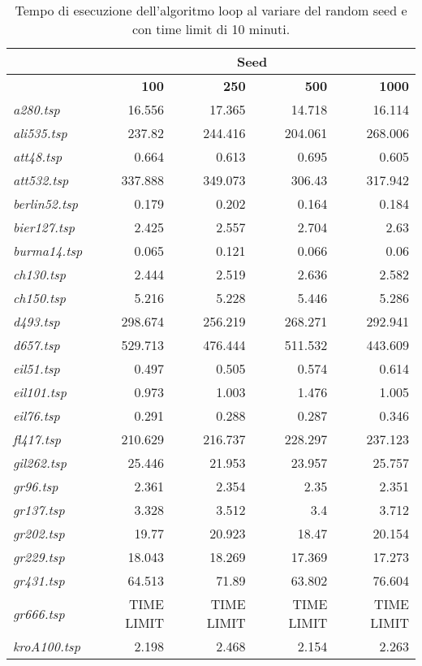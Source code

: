 {\footnotesize
\begin{longtable}[H]{lrrrr}
\caption{Tempo di esecuzione dell'algoritmo loop al variare del random seed e con time limit di 10 minuti.}\\
\cline{2-5}
{} & \multicolumn{4}{c}{\textbf{Seed}}\\
\hline
{} & \textbf{100} & \textbf{250} & \textbf{500} & \textbf{1000}\\
\hline
\textit{a280.tsp} & 16.556 & 17.365 & 14.718 & 16.114\\
\textit{ali535.tsp} & 237.82 & 244.416 & 204.061 & 268.006\\
\textit{att48.tsp} & 0.664 & 0.613 & 0.695 & 0.605\\
\textit{att532.tsp} & 337.888 & 349.073 & 306.43 & 317.942\\
\textit{berlin52.tsp} & 0.179 & 0.202 & 0.164 & 0.184\\
\textit{bier127.tsp} & 2.425 & 2.557 & 2.704 & 2.63\\
\textit{burma14.tsp} & 0.065 & 0.121 & 0.066 & 0.06\\
\textit{ch130.tsp} & 2.444 & 2.519 & 2.636 & 2.582\\
\textit{ch150.tsp} & 5.216 & 5.228 & 5.446 & 5.286\\
\textit{d493.tsp} & 298.674 & 256.219 & 268.271 & 292.941\\
\textit{d657.tsp} & 529.713 & 476.444 & 511.532 & 443.609\\
\textit{eil51.tsp} & 0.497 & 0.505 & 0.574 & 0.614\\
\textit{eil101.tsp} & 0.973 & 1.003 & 1.476 & 1.005\\
\textit{eil76.tsp} & 0.291 & 0.288 & 0.287 & 0.346\\
\textit{fl417.tsp} & 210.629 & 216.737 & 228.297 & 237.123\\
\textit{gil262.tsp} & 25.446 & 21.953 & 23.957 & 25.757\\
\textit{gr96.tsp} & 2.361 & 2.354 & 2.35 & 2.351\\
\textit{gr137.tsp} & 3.328 & 3.512 & 3.4 & 3.712\\
\textit{gr202.tsp} & 19.77 & 20.923 & 18.47 & 20.154\\
\textit{gr229.tsp} & 18.043 & 18.269 & 17.369 & 17.273\\
\textit{gr431.tsp} & 64.513 & 71.89 & 63.802 & 76.604\\
\textit{gr666.tsp} & TIME LIMIT & TIME LIMIT & TIME LIMIT & TIME LIMIT\\
\textit{kroA100.tsp} & 2.198 & 2.468 & 2.154 & 2.263\\

\end{longtable}}
